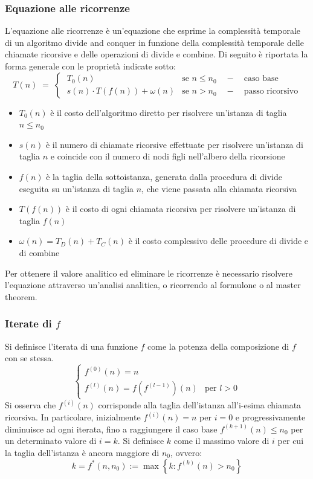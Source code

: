 \subsubsection*{Equazione alle ricorrenze}
L'equazione alle ricorrenze è un'equazione che esprime la complessità temporale di un algoritmo divide and conquer
in funzione della complessità temporale delle chiamate ricorsive e delle operazioni di divide e combine. Di seguito
è riportata la forma generale con le proprietà indicate sotto:
\[T(n) \; = \; \begin{cases}
	\; T_0(n) & \text{se } n \leq n_0 \quad - \quad \text{caso base} \\[3pt]
	\; s(n) \cdot T(f(n)) + \omega(n) & \text{se } n > n_0 \quad - \quad \text{passo ricorsivo}
\end{cases}\]
\begin{itemize}
	\item \(T_0(n)\) è il costo dell'algoritmo diretto per risolvere un'istanza di taglia \(n \leq n_0\)
	\item \(s(n)\) è il numero di chiamate ricorsive effettuate per risolvere un'istanza di taglia \(n\) e coincide con
	il numero di nodi figli nell'albero della ricorsione
	\item \(f(n)\) è la taglia della sottoistanza, generata dalla procedura di divide eseguita su un'istanza di taglia
	\(n\), che viene passata alla chiamata ricorsiva
	\item \(T(f(n))\) è il costo di ogni chiamata ricorsiva per risolvere un'istanza di taglia \(f(n)\)
	\item \(\omega(n) = T_D(n) + T_C(n)\) è il costo complessivo delle procedure di divide e di combine
\end{itemize}

\vspace{5pt}

\noindent
Per ottenere il valore analitico ed eliminare le ricorrenze è necessario risolvere l'equazione attraverso un'analisi
analitica, o ricorrendo al formulone o al master theorem.

\subsubsection*{Iterate di \(f\)}
Si definisce l'iterata di una funzione \(f\) come la potenza della composizione di \(f\) con se stessa.
\[\begin{cases}
	f^{(0)}(n) = n \\[3pt]
	f^{(l)}(n) = f(f^{(l-1)})(n) & \text{per } l > 0
\end{cases}\]
Si osserva che \(f^{(i)}(n)\) corrisponde alla taglia dell'istanza all'i-esima chiamata ricorsiva. In particolare,
inizialmente \(f^{(i)}(n) = n\) per \(i = 0\) e progressivamente diminuisce ad ogni iterata, fino a raggiungere il caso
base \(f^{(k+1)}(n) \leq n_0\) per un determinato valore di \(i = k\). Si definisce \(k\) come il massimo valore di \(i\)
per cui la taglia dell'istanza è ancora maggiore di \(n_0\), ovvero:
\[k = f^*(n, n_0) := \max \left\{ k : f^{(k)}(n) > n_0 \right\}\]


